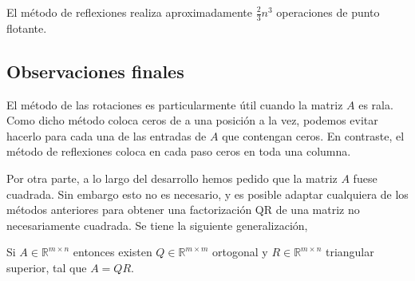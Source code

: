 El método de reflexiones realiza aproximadamente $\frac{2}{3}n^3$ operaciones de punto flotante.

\subsection{Observaciones finales}

El método de las rotaciones es particularmente útil cuando la matriz $A$ es rala. Como dicho método coloca ceros de a una posición a la vez, podemos evitar hacerlo para cada una de las entradas de $A$ que contengan ceros. En contraste, el método de reflexiones coloca en cada paso ceros en toda una columna.

Por otra parte, a lo largo del desarrollo hemos pedido que la matriz $A$ fuese cuadrada. Sin embargo esto no es necesario, y es posible adaptar cualquiera de los métodos anteriores para obtener una factorización QR de una matriz no necesariamente cuadrada. Se tiene la siguiente generalización,

\begin{propo}
Si $A \in \mathbb{R}^{m \times n}$ entonces existen $Q \in \mathbb{R}^{m \times m}$ ortogonal y $R \in \mathbb{R}^{m \times n}$ triangular superior, tal que $A = QR$.
\end{propo}


